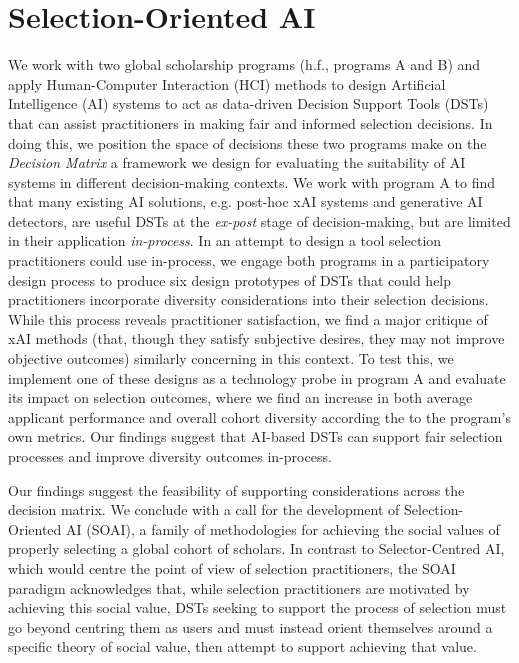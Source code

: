 \section{Selection-Oriented AI} %
We work with two global scholarship programs (h.f., programs A and B) and apply Human-Computer Interaction (HCI) methods to design Artificial Intelligence (AI) systems to act as data-driven Decision Support Tools (DSTs) that can assist practitioners in making fair and informed selection decisions. In doing this, we position the space of decisions these two programs make on the \emph{Decision Matrix} a framework we design for evaluating the suitability of AI systems in different decision-making contexts. We work with program A to find that many existing AI solutions, e.g. post-hoc xAI systems and generative AI detectors, are useful DSTs at the \emph{ex-post} stage of decision-making, but are limited in their application \emph{in-process}. In an attempt to design a tool selection practitioners could use in-process, we engage both programs in a participatory design process to produce six design prototypes of DSTs that could help practitioners incorporate diversity considerations into their selection decisions. While this process reveals practitioner satisfaction, we find a major critique of xAI methods (that, though they satisfy subjective desires, they may not improve objective outcomes) similarly concerning in this context. To test this, we implement one of these designs as a technology probe in program A and evaluate its impact on selection outcomes, where we find an increase in both average applicant performance and overall cohort diversity according the to the program's own metrics. Our findings suggest that AI-based DSTs can support fair selection processes and improve diversity outcomes in-process.

Our findings suggest the feasibility of supporting considerations across the decision matrix. We conclude with a call for the development of Selection-Oriented AI (SOAI), a family of methodologies for achieving the social values of properly selecting a global cohort of scholars. In contrast to Selector-Centred AI, which would centre the point of view of selection practitioners, the SOAI paradigm acknowledges that, while selection practitioners are motivated by achieving this social value, DSTs seeking to support the process of selection must go beyond centring them as users and must instead orient themselves around a specific theory of social value, then attempt to support achieving that value.


